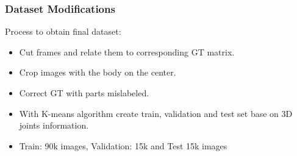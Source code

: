 \documentclass{beamer}
\begin{document}

\begin{frame}
\frametitle{Dataset Modifications}

Process to obtain final dataset:

\begin{itemize}
\item Cut frames and relate them to corresponding GT matrix.
\item Crop images with the body on the center.
\item Correct GT with parts mislabeled.
\item With K-means algorithm create train, validation and test set base on 3D joints information.
\item Train: 90k images, Validation: 15k and Test 15k images
\end{itemize}

\end{frame}

\end{document}
